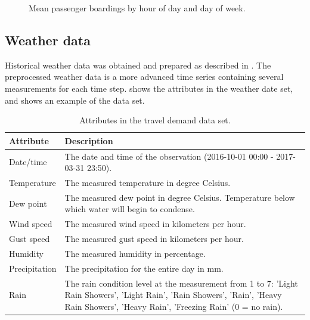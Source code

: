 \documentclass[a4paper,11pt]{article}
\begin{document}
\begin{figure}[!ht]
    \center
    
    \caption{Mean passenger boardings by hour of day and day of week.}
    \label{fig:travelcard_hist}
\end{figure}
\clearpage

\subsection{Weather data}\label{ch:desc_weather}
Historical weather data was obtained and prepared as described in . The preprocessed weather data is a more advanced time series containing several measurements for each time step.  shows the attributes in the weather date set, and  shows an example of the data set.

\begin{table}[!ht]
    \center
    \begin{tabular}{p{1in}p{4in}}        
        Attribute & Description \\
        \hline 
        \hline 
        Date/time & The date and time of the observation (2016-10-01 00:00 - 2017-03-31 23:50). \\
        \hline         
        Temperature & The measured temperature in degree Celsius. \\
        \hline         
        Dew point & The measured dew point in degree Celsius. Temperature below which water will begin to condense. \\
        \hline         
        Wind speed & The measured wind speed in kilometers per hour. \\
        \hline         
        Gust speed & The measured gust speed in kilometers per hour. \\
        \hline         
        Humidity & The measured humidity in percentage. \\
        \hline         
        Precipitation & The precipitation for the entire day in mm. \\
        \hline         
        Rain & The rain condition level at the measurement from 1 to 7: 'Light Rain Showers', 'Light Rain',
  'Rain Showers', 'Rain',
  'Heavy Rain Showers', 'Heavy Rain',
  'Freezing Rain' (0 = no rain). \\
    \end{tabular}
    \caption{Attributes in the travel demand data set.}
    \label{tab:weather_data_attr}
\end{table}
\end{document}
